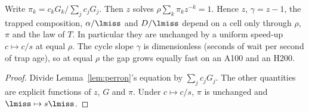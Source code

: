 \begin{corollary}[invariance]\label{cor:trapinv}
Write $\pi_k=c_kG_k/\sum_jc_jG_j$. Then $z$ solves $\rho\sum_k\pi_kz^{-k}=1$. Hence $z$, $\gamma=z-1$, the trapped
composition, $\alpha/\lmiss$ and $D/\lmiss$ depend on a cell only through $\rho$, $\pi$ and the law of $T$. In particular they
are unchanged by a uniform speed-up $c\mapsto c/s$ at equal $\rho$. The cycle slope $\gamma$ is dimensionless (seconds of wait
per second of trap age), so at equal $\rho$ the gap grows equally fast on an A100 and an H200.
\end{corollary}

\begin{proof}
Divide Lemma~\ref{lem:perron}'s equation by $\sum_jc_jG_j$. The other quantities are explicit functions of $z$, $G$ and
$\pi$. Under $c\mapsto c/s$, $\pi$ is unchanged and $\lmiss\mapsto s\lmiss$.
\end{proof}

